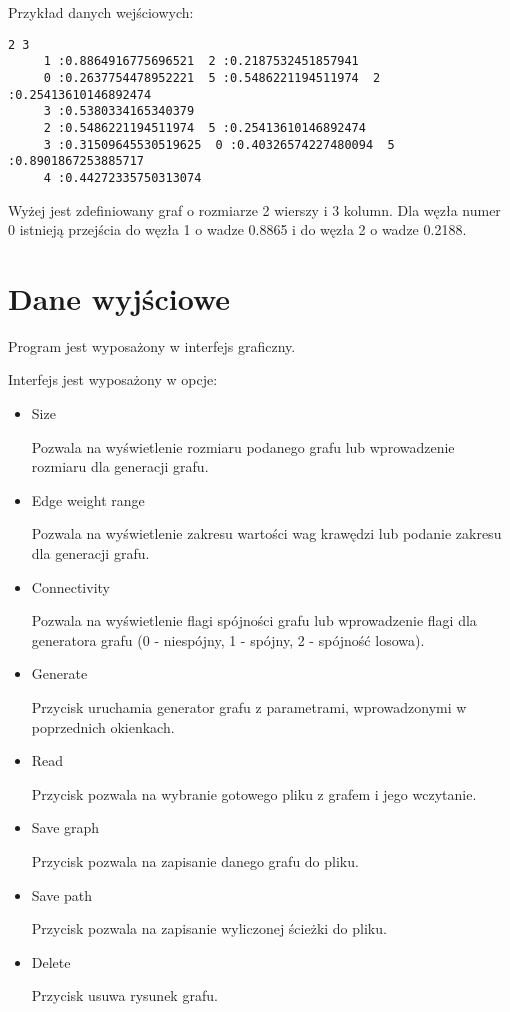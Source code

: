 \documentclass[]{article}
\begin{document}
Przykład danych wejściowych:

\begin{verbatim}
2 3
	 1 :0.8864916775696521  2 :0.2187532451857941 
	 0 :0.2637754478952221  5 :0.5486221194511974  2 :0.25413610146892474
	 3 :0.5380334165340379
	 2 :0.5486221194511974  5 :0.25413610146892474
	 3 :0.31509645530519625  0 :0.40326574227480094  5 :0.8901867253885717
	 4 :0.44272335750313074
\end{verbatim}
Wyżej jest zdefiniowany graf o rozmiarze 2 wierszy i 3 kolumn. Dla węzła numer 0 istnieją przejścia do węzła 1 o wadze 0.8865 i do węzła 2 o wadze 0.2188.

\section{Dane wyjściowe}\label{header-n279}
Program jest wyposażony w interfejs graficzny.

Interfejs jest wyposażony w opcje:
\begin{itemize}
    \item Size
    
    Pozwala na wyświetlenie rozmiaru podanego grafu lub wprowadzenie rozmiaru dla generacji grafu.
    \item Edge weight range
    
    Pozwala na wyświetlenie zakresu wartości wag krawędzi lub podanie zakresu dla generacji grafu.
    
    \item Connectivity
    
    Pozwala na wyświetlenie flagi spójności grafu lub wprowadzenie flagi dla generatora grafu (0 - niespójny, 1 - spójny, 2 - spójność losowa).
    \item Generate
    
    Przycisk uruchamia generator grafu z parametrami, wprowadzonymi w poprzednich okienkach.
    \item Read
    
    Przycisk pozwala na wybranie gotowego pliku z grafem i jego wczytanie.
    \item Save graph
    
    Przycisk pozwala na zapisanie danego grafu do pliku.
    \item Save path
    
    Przycisk pozwala na zapisanie wyliczonej ścieżki do pliku.
    \item Delete
    
    Przycisk usuwa rysunek grafu.
\end{itemize}
\end{document}
